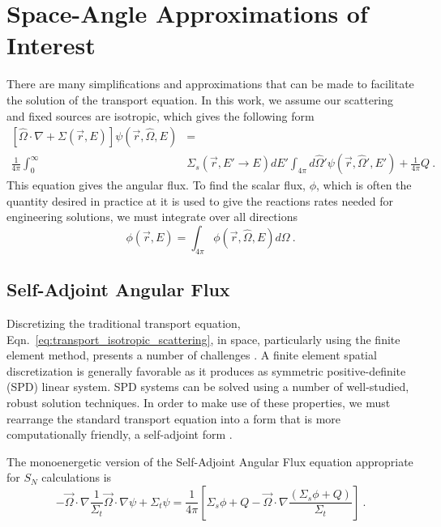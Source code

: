 \section{Space-Angle Approximations of Interest}
There are many simplifications and approximations that can be made to facilitate the solution of the transport equation. In this work, we assume our scattering and fixed sources are isotropic, which gives the following form
%
\begin{equation}
\begin{split}
 [\hat{\Omega} \cdot \nabla + \Sigma(\vec{r}, E)]\psi(\vec{r}, \hat{\Omega}, E) &= \\ \frac{1}{4\pi}  \int_0^\infty &\Sigma_s(\vec{r}, E' \rightarrow E)  dE' \int_{4\pi} d\hat{\Omega}'\psi(\vec{r}, \hat{\Omega}', E')  + \frac{1}{4\pi}Q \:.
\end{split}
 \label{eq:transport_isotropic_scattering}
\end{equation}
%
This equation gives the angular flux. To find the scalar flux, $\phi$, which is often the quantity desired in practice at it is used to give the reactions rates needed for engineering solutions, we must integrate over all directions
\begin{equation}
    \phi(\vec{r}, E) = \int_{4\pi} \phi(\vec{r}, \hat{\Omega}, E) d \Omega \:.
\end{equation}

\subsection{Self-Adjoint Angular Flux}
Discretizing the traditional transport equation, Eqn.~\eqref{eq:transport_isotropic_scattering}, in space, particularly using the finite element method, presents a number of challenges \cite{saaf}. A finite element spatial discretization is generally favorable as it produces as symmetric positive-definite (SPD) linear system. SPD systems can be solved using a number of well-studied, robust solution techniques. In order to make use of these properties, we must rearrange the standard transport equation into a form that is more computationally friendly, a self-adjoint form \cite{saaf}.

The monoenergetic version of the Self-Adjoint Angular Flux equation appropriate for $S_N$ calculations is 
\begin{equation}
    - \vec{\Omega} \cdot \nabla \frac{1}{\Sigma_t}\vec{\Omega} \cdot \nabla \psi + \Sigma_t \psi = \frac{1}{4\pi}[\Sigma_s\phi + Q - \vec{\Omega} \cdot \nabla \frac{(\Sigma_s\phi + Q)}{\Sigma_t}]\:.
    \label{eq:SAAF}
\end{equation}


